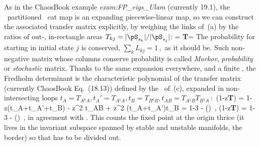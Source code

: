 {    %
As in the Chaos\-Book example
{\em exam:FP\_eigs\_Ulam} (currently 19.1),  %
the \AW\ partitioned \PV\ cat map is an expanding
piecewise-linear map, so we can construct the associated transfer matrix %
explicitly,
by weighing the links of {\markGraph} \,(a) by the
ratios of out-, in-\-rectangle areas $T_{kj}=
|\pS_{\Ssym{k}}|/|\pS_{\Ssym{j}}|$:
\beq
{}
=
{\bf T}\phi=
The probability for starting in initial
state $j$ is conserved,
\(
\sum_{{k}}L_{{k}{j}}=1
\,,
\)
as it should be.
Such non-negative matrix whose columns conserve
probability  is called {\em Markov}, {\em
probability} or {\em stochastic} matrix.
Thanks to the same expansion everywhere, and a finite \markGraph, the
Fredholm determinant is the characteristic polynomial of the transfer
matrix (currently Chaos\-Book Eq.~(18.13)) defined by the \markGraph\ of
\,(c), expanded in non-intersecting loops
\(
t_A = T_{A{}^0\!A},
t_A' = T_{A{}^1\!A},
t_B = T_{B{}^0\!B},
t_{AB} = T_{A{}^{\underline{1}}\!B} T_{B{}^{1}\!A}
\,:
\)
\beq
\det (1-z{\bf T})
     =  1-z(t_A+t_A'+t_{B}) - z^2 t_{AB} + z^2 (t_A+t_A')t_{B}
     =  1-3 - ()
\,,
\label{CattyZeta}
\eeq
\beq
\det (1-z{\bf T})
     =  1-3 - ()
\,,
\label{CattyZeta1}
\eeq
in agreement with .
This counts the fixed point at the origin thrice (it lives
in the invariant subspace spanned by stable and unstable manifolds, the
border) so that has to be divided out.

}
